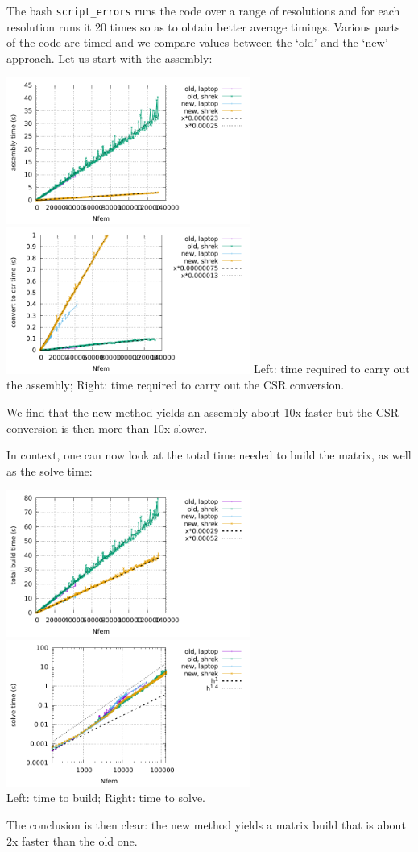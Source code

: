 The bash {\tt script\_errors} runs the code over a range of resolutions 
and for each resolution runs it 20 times so as to obtain better average 
timings. 
Various parts of the code are timed and we compare values between the `old'
and the `new' approach.
Let us start with the assembly:
\begin{center}
\includegraphics[width=8cm]{python_codes/fieldstone_176/results/assembly.pdf}
\includegraphics[width=8cm]{python_codes/fieldstone_176/results/convert2csr.pdf}
{\captionfont Left: time required to carry out the assembly; Right: time
required to carry out the CSR conversion.}
\end{center}
We find that the new method yields an assembly about 10x faster 
but the CSR conversion is then more than 10x slower. 

In context, one can now look at the total time needed to build the matrix,
as well as the solve time:
\begin{center}
\includegraphics[width=8cm]{python_codes/fieldstone_176/results/build.pdf}
\includegraphics[width=8cm]{python_codes/fieldstone_176/results/solve.pdf}\\
{\captionfont Left: time to build; Right: time to solve.}
\end{center}
The conclusion is then clear: the new method yields a matrix build that 
is about 2x faster than the old one.

